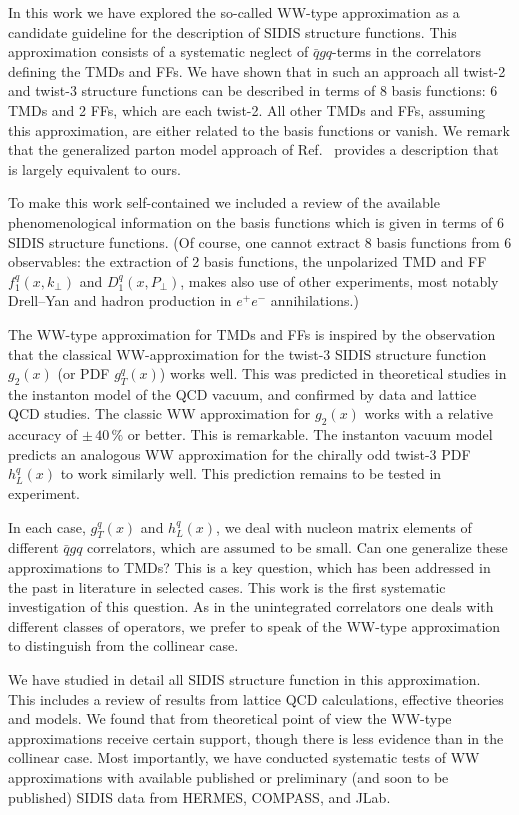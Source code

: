 \documentclass[a4paper,11pt]{article}
\def\kperp{k_\perp}
\def\pperp{P_\perp}
\begin{document}
In this work we have explored the so-called WW-type approximation
as a candidate guideline for the description of SIDIS structure
functions. This approximation consists of a systematic neglect
of $\bar{q}gq$-terms in the
correlators defining the TMDs and FFs. We have shown that in such
an approach all twist-2 and twist-3 structure functions can be
described in terms of 8 basis functions: 6 TMDs and 2 FFs,
which are each twist-2. All other TMDs and FFs, assuming this
approximation, are either related to the basis functions or
vanish.
We remark that the generalized parton model
approach of Ref.~\cite{Anselmino:2011ch} provides a description
that is largely equivalent to ours.

To make this work self-contained we included a review of the
available phenomenological information on the basis functions
which is given in terms of 6 SIDIS structure functions.
(Of course, one cannot extract 8 basis
functions from 6 observables: the extraction of 2 basis functions,
the unpolarized TMD and FF $f_1^q(x,\kperp)$ and $D_1^q(x,\pperp)$,
makes also use of other experiments, most notably Drell--Yan
and hadron production in $e^+e^-$ annihilations.)

The WW-type approximation for TMDs and FFs is inspired by the
observation that the classical WW-approximation for the twist-3
SIDIS structure function $g_2(x)$ (or PDF $g_T^q(x)$) works well.
This was predicted in theoretical studies in the instanton model
of the QCD vacuum, and confirmed by data and lattice QCD studies.
The classic WW approximation for $g_2(x)$ works with a relative
accuracy of $\pm\,40\,\%$ or better. This is remarkable.
The instanton vacuum model predicts an analogous WW approximation
for the chirally odd twist-3 PDF $h_L^q(x)$ to work similarly
well. This prediction remains to be tested in experiment.

In each case, $g_T^q(x)$ and $h_L^q(x)$, we deal with nucleon
matrix elements of different $\bar{q}gq$ correlators, which are
assumed to be small. Can one generalize these approximations to
TMDs? This is a key question, which has been addressed in the
past in literature in selected cases. This work is the first
systematic investigation of this question.
As in the unintegrated correlators one deals with different
classes of operators, we prefer to speak of the
WW-type approximation to distinguish from the collinear case.

We have studied in detail all SIDIS structure function in
this approximation. This includes a review of results from
lattice QCD calculations, effective theories and models.
We found that from theoretical point of view the WW-type
approximations receive certain support, though there is
less evidence than in the collinear case.
Most importantly, we have conducted systematic tests of
WW approximations with available published or
preliminary (and soon to be published) SIDIS data
from HERMES, COMPASS, and JLab.
\end{document}

